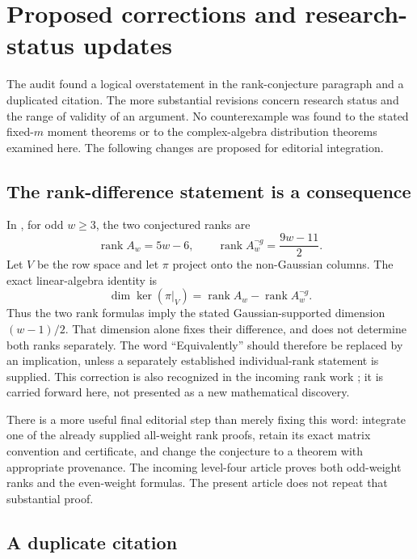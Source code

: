 \section{Proposed corrections and research-status updates}
\label{cont:sec:editorial}

The audit found a logical overstatement in the rank-conjecture
paragraph and a duplicated citation. The more substantial revisions
concern research status and the range of validity of an argument.
No counterexample was found to the stated fixed-$m$ moment theorems
or to the complex-algebra distribution theorems examined here.
The following changes are proposed for editorial integration.

\subsection{The rank-difference statement is a consequence}

In , for odd $w\ge3$, the two
conjectured ranks are
\[
 \operatorname{rank}A_w=5w-6,\qquad
 \operatorname{rank}A_w^{\neg g}=\frac{9w-11}{2}.
\]
Let $V$ be the row space and let $\pi$ project onto the
non-Gaussian columns. The exact linear-algebra identity is
\begin{equation}\label{cont:eq:rank-difference}
 \dim\ker(\pi|_V)
  =\operatorname{rank}A_w-\operatorname{rank}A_w^{\neg g}.
\end{equation}
Thus the two rank formulas imply the stated Gaussian-supported
dimension $(w-1)/2$. That dimension alone fixes their difference,
and does not determine both ranks separately. The word
``Equivalently'' should therefore be replaced by an implication,
unless a separately established individual-rank statement is supplied.
This correction is also recognized in the incoming rank work
\cite{cont:RankIncoming,cont:FormalIncoming}; it is carried forward
here, not presented as a new mathematical discovery.

There is a more useful final editorial step than merely fixing this
word: integrate one of the already supplied all-weight rank proofs,
retain its exact matrix convention and certificate, and change the
conjecture to a theorem with appropriate provenance. The incoming
level-four article proves both odd-weight ranks and the even-weight
formulas. The present article does not repeat that substantial proof.

\subsection{A duplicate citation}

